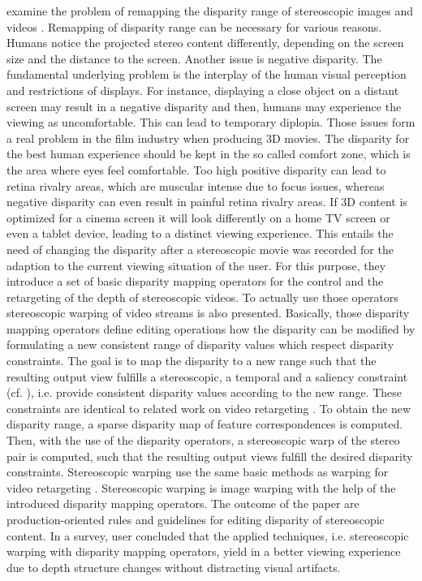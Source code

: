 \citeauthor{lang2010nonlinear} examine the problem of remapping the disparity range of stereoscopic images and videos \citep{lang2010nonlinear}.
Remapping of disparity range can be necessary for various reasons.
Humans notice the projected stereo content differently, depending on the screen size and the distance to the screen.
Another issue is negative disparity.
The fundamental underlying problem is the interplay of the human visual perception and restrictions of displays.
For instance, displaying a close object on a distant screen may result in a negative disparity and then, humans may experience the viewing as uncomfortable.
This can lead to temporary diplopia.
Those issues form a real problem in the film industry when producing 3D movies.
The disparity for the best human experience should be kept in the so called comfort zone, which is the area where eyes feel comfortable.
Too high positive disparity can lead to retina rivalry areas, which are muscular intense due to focus issues, whereas negative disparity can even result in painful retina rivalry areas.
If 3D content is optimized for a cinema screen it will look differently on a home TV screen or even a tablet device, leading to a distinct viewing experience.
This entails the need of changing the disparity after a stereoscopic movie was recorded for the adaption to the current viewing situation of the user.
For this purpose, they introduce a set of basic disparity mapping operators for the control and the retargeting of the depth of stereoscopic videos.
To actually use those operators stereoscopic warping of video streams is also presented.
Basically, those disparity mapping operators define editing operations how the disparity can be modified by formulating a new consistent range of disparity values which respect disparity constraints.
The goal is to map the disparity to a new range such that the resulting output view fulfills a stereoscopic, a temporal and a saliency constraint (cf. \citep{lang2010nonlinear}), i.e. provide consistent disparity values according to the new range.
These constraints are identical to related work on video retargeting \citep{krahenbuhl2009system}.
To obtain the new disparity range, a sparse disparity map of feature correspondences is computed.
Then, with the use of the disparity operators, a stereoscopic warp of the stereo pair is computed, such that the resulting output views fulfill the desired disparity constraints.
Stereoscopic warping use the same basic methods as warping for video retargeting \citep{shamir2009visual}.
Stereoscopic warping is image warping with the help of the introduced disparity mapping operators.
The outcome of the paper are production-oriented rules and guidelines for editing disparity of stereoscopic content.
In a survey, user concluded that the applied techniques, i.e. stereoscopic warping with disparity mapping operators, yield in a better viewing experience due to depth structure changes without distracting visual artifacts.
